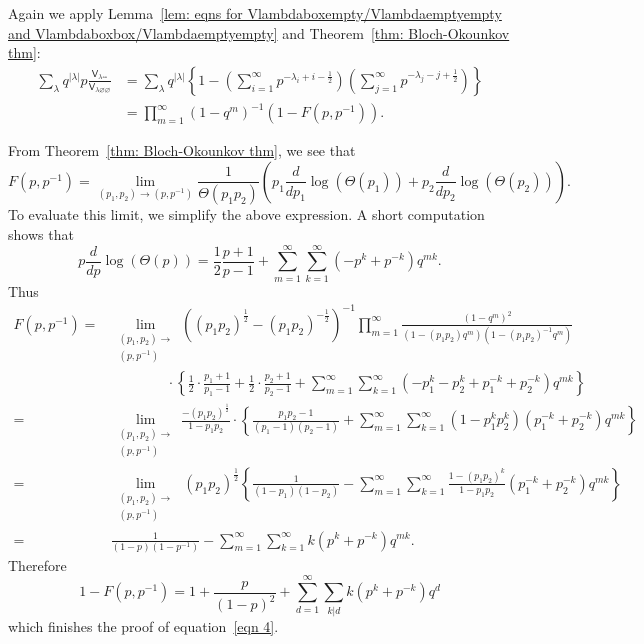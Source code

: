 \documentclass[12pt]{amsart}
\newcommand{\Vsf}{\mathsf{V}}
\newcommand{\bx}{\square}
\renewcommand{\emptyset}{\varnothing}
\newcommand{\half}{\frac{1}{2}}
\theoremstyle{definition}
\begin{document}
Again we apply Lemma~\ref{lem: eqns for
Vlambdaboxempty/Vlambdaemptyempty and Vlambdaboxbox/Vlambdaemptyempty}
and Theorem~\ref{thm: Bloch-Okounkov thm}:
\begin{align*}
\sum_{\lambda} q^{|\lambda |}p \frac{\Vsf_{\lambda \bx
\bx}}{\Vsf_{\lambda \emptyset \emptyset}} &= \sum_{\lambda}
q^{|\lambda
|}\left\{1-\left(\sum_{i=1}^{\infty}p^{-\lambda_{i}+i-\half}
\right)\left(\sum_{j=1}^{\infty}p^{-\lambda_{j}-j+\half} \right)  \right\}\\
&= \prod_{m=1}^{\infty}(1-q^{m})^{-1} \left(1-F(p,p^{-1}) \right).
\end{align*}

From Theorem~\ref{thm: Bloch-Okounkov thm}, we see that 
\[
F(p,p^{-1}) = \lim_{ (p_{1},p_{2})\to (p,p^{-1}) } \frac{1}{\Theta
(p_{1}p_{2})} \left(p_{1}\frac{d}{dp_{1}}\log(\Theta (p_{1}))+ p_{2}\frac{d}{dp_{2}}\log(\Theta (p_{2})) \right).
\]
To evaluate this limit, we simplify the above expression. A short
computation shows that 
\[
p\frac{d}{dp}\log(\Theta (p)) = \half \frac{p+1}{p-1}
+\sum_{m=1}^{\infty}\sum_{k=1}^{\infty} \left(-p^{k}+p^{-k} \right)
q^{mk}.
\]
Thus
\begin{align*}
F(p,p^{-1}) =& \lim_{\begin{smallmatrix} (p_{1},p_{2})\to \\
(p,p^{-1}) \end{smallmatrix}}
\left((p_{1}p_{2})^{\half} - (p_{1}p_{2})^{-\half} \right)^{-1}
\prod_{m=1}^{\infty}
\frac{(1-q^{m})^{2}}{(1-(p_{1}p_{2})q^{m})(1-(p_{1}p_{2})^{-1}q^{m})} \\
&\quad \quad \quad \quad \cdot \left\{\half \cdot \frac{p_{1}+1}{p_{1}-1}+\half \cdot \frac{p_{2}+1}{p_{2}-1}
+\sum_{m=1}^{\infty}\sum_{k=1}^{\infty}
\left(-p_{1}^{k}-p_{2}^{k}+p_{1}^{-k}+p_{2}^{-k} \right)q^{mk}
\right\} \\
=&  \lim_{\begin{smallmatrix} (p_{1},p_{2})\to \\
(p,p^{-1}) \end{smallmatrix}}
\frac{-(p_{1}p_{2})^{\half}}{1-p_{1}p_{2}} \cdot
\left\{\frac{p_{1}p_{2}-1}{(p_{1}-1)(p_{2}-1)} +
\sum_{m=1}^{\infty}\sum_{k=1}^{\infty} (1-p_{1}^{k}p_{2}^{k})(p_{1}^{-k}+p_{2}^{-k})q^{mk} \right\}\\
= &  \lim_{\begin{smallmatrix} (p_{1},p_{2})\to \\
(p,p^{-1}) \end{smallmatrix}}
\,(p_{1}p_{2})^{\half} \left\{\frac{1}{(1-p_{1})(1-p_{2})} -
\sum_{m=1}^{\infty }\sum_{k=1}^{\infty } \frac{1-(p_{1}p_{2})^{k}}{1-p_{1}p_{2}}(p_{1}^{-k}+p_{2}^{-k})q^{mk} \right\}\\
=& \frac{1}{(1-p)(1-p^{-1})} - \sum_{m=1}^{\infty}\sum_{k=1}^{\infty}
k(p^{k}+p^{-k})q^{mk}. 
\end{align*}
Therefore 
\[
1-F(p,p^{-1}) = 1 +\frac{p}{(1-p)^{2}} + \sum_{d=1}^{\infty}\sum_{k|d}k(p^{k}+p^{-k})q^{d}
\]
which finishes the proof of equation~\eqref{eqn 4}.
\end{document}
